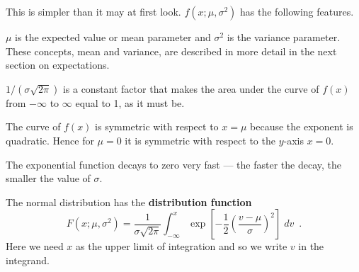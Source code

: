 This is simpler than it may at first look. $f(x;\mu, \sigma^2)$ has the following features.
\bit
\item $\mu$ is the expected value or mean parameter and $\sigma^2$ is the variance parameter. These concepts, mean and variance, are described in more detail in the next section on expectations.
\item $1/(\sigma\sqrt{2\pi})$ is a constant factor that makes the area under the curve of $f(x)$ from $-\infty$ to $\infty$ equal to 1, as it must be.
\item The curve of $f(x)$ is symmetric with respect to $x=\mu$ because the exponent is quadratic. Hence for $\mu=0$ it is symmetric with respect to the $y$-axis $x=0$.
\item The exponential function decays to zero very fast --- the faster the decay, the smaller the value of $\sigma$.
\eit


\begin{framed}
The normal distribution has the {\bf distribution function}
\begin{equation}\label{eqn:norm_int_cdf}F(x; \mu, \sigma^2)=\frac{1}{\sigma\sqrt{2\pi}}\int_{-\infty}^x\exp\left[-\frac{1}{2}\left(\frac{v-\mu}{\sigma}\right)^2\right]\;dv\enspace.\end{equation}
Here we need $x$ as the upper limit of integration and so we write $v$ in the integrand.
\end{framed}


